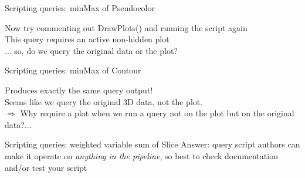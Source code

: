 
\begin{frame}{Scripting queries: minMax of Pseudocolor}
  
  \begin{block}{}{}\vspace{-3mm}\outIdentical\vspace{-3mm}\end{block}
  \bigskip
  \pause
  Now try commenting out DrawPlots() and running the script again\\
  \pause
  This query requires an active non-hidden plot\\ ... so, do we query the original data or the plot?
\end{frame}

\begin{frame}{Scripting queries: minMax of Contour}
  
  \pause
  Produces exactly the same query output!\\
  Seems like we query the original 3D data, not the plot.\\
  $\Rightarrow$ Why require a plot when we run a query not on the plot but on the original data?...
\end{frame}

\begin{frame}{Scripting queries: weighted variable sum of Slice}
  Answer: query script authors can make it operate on \emph{anything in the pipeline},
  so best to check documentation and/or test your script
  \bigskip
  
\end{frame}

